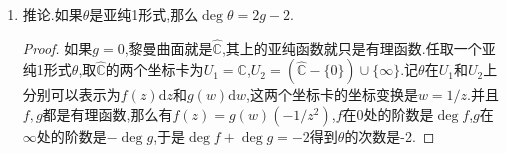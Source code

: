 \begin{enumerate}
\begin{proof}
		我们有$\int_{\Sigma}\alpha\wedge\theta_c=-\sum_i\int_{\Sigma}\alpha\wedge\overline{\partial}R_i=\sum_i\int_{\Sigma}\mathrm{d}(R_i\alpha)=-\sum_i\int_{B_i}R_i\alpha$.其中$B_i$是$p_i$的足够小的附近,那么$R_i=c_1^{(i)}/z+\cdots+c_{m_i}^{(i)}/z^{m_i}$,并且$\alpha$是一个全纯1形式,可记作$\alpha=(s_0+s_1z+\cdots+\cdots)\mathrm{d}z$.于是上式$=-\sum_i(c_1^{(i)}s_0+c_2^{(i)}s_1+\cdots+c_{m_i}^{(i)}s_{m_i-1})$,把这个结果记作$\mathrm{Res}(\alpha R_c)$.下面构造$\varphi:\mathbb{C}^d\to\mathbb{C}^g$为$c\mapsto\left(\mathrm{Res}(R_c\alpha_1),\cdots,\mathrm{Res}(R_c\alpha_g)\right)$.于是我们之前的$\dim\{c\in\mathbb{C}^d\mid\int_{\Sigma}\alpha_i\wedge\theta_c=0.,i=1,\cdots,g\}=\dim\ker\varphi$.于是$\dim L(D)=1+\dim\ker\varphi=1+d-\dim\mathrm{im}\varphi$.进一步有$\dim\mathrm{im}\varphi=g-\dim(\mathrm{im}\varphi)^{\perp}$,这里是取$\mathbb{C}^g$上的典范Hermitian内积定义的正交补.最后唯一要说明的是$\mathrm{im}\varphi^{\perp}\cong\Omega(D)$.但是$\mathrm{im}\varphi^{\perp}$中的元素要满足$\sum_i(s_0c_1^{(i)}+s_1c_2^{(i)}+\cdots+s_{m_i-1}c_{m_i}^{(i)})$对任意的$c_{j}^{(i)}$都要为零,这迫使$s_0=s_1=\cdots=s_{m_i-1}=0$,也即$\alpha$在$p_i$处的阶数$\ge m_i$.于是$\dim(\mathrm{im}\varphi)^{\perp}=\dim\{\alpha\mid\mathrm{ord}_{p_i}\alpha\ge m_i,\forall i\}=\dim\Omega(D)$.这就完成证明.
	\end{proof}
    \item 推论.如果$\theta$是亚纯1形式,那么$\deg\theta=2g-2$.
    \begin{proof}
    	
    	如果$g=0$,黎曼曲面就是$\widehat{\mathbb{C}}$,其上的亚纯函数就只是有理函数.任取一个亚纯1形式$\theta$,取$\widehat{\mathbb{C}}$的两个坐标卡为$U_1=\mathbb{C}$,$U_2=(\widehat{\mathbb{C}}-\{0\})\cup\{\infty\}$.记$\theta$在$U_1$和$U_2$上分别可以表示为$f(z)\mathrm{d}z$和$g(w)\mathrm{d}w$,这两个坐标卡的坐标变换是$w=1/z$.并且$f,g$都是有理函数,那么有$f(z)=g(w)\left(-1/z^2\right)$,$f$在0处的阶数是$\deg f$,$g$在$\infty$处的阶数是$-\deg g$,于是$\deg f+\deg g=-2$得到$\theta$的次数是-2.
    	
    	\qquad
    	

\end{proof}
\end{enumerate}
